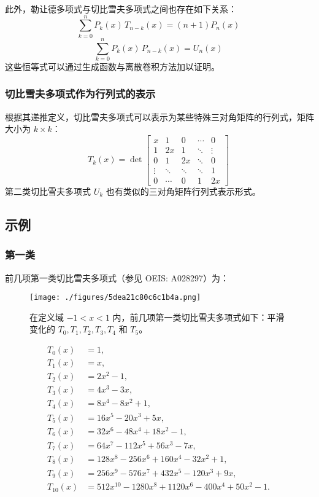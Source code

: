 此外，勒让德多项式与切比雪夫多项式之间也存在如下关系：
$$
\sum_{k=0}^{n} P_k(x)\, T_{n-k}(x) = (n + 1) P_n(x)~
$$
$$
\sum_{k=0}^{n} P_k(x)\, P_{n-k}(x) = U_n(x)~
$$
这些恒等式可以通过生成函数与离散卷积方法加以证明。
\subsubsection{切比雪夫多项式作为行列式的表示}
根据其递推定义，切比雪夫多项式可以表示为某些特殊三对角矩阵的行列式，矩阵大小为 $k \times k$：
$$
T_k(x) = \det
\begin{bmatrix}
x & 1 & 0 & \cdots & 0 \\
1 & 2x & 1 & \ddots & \vdots \\
0 & 1 & 2x & \ddots & 0 \\
\vdots & \ddots & \ddots & \ddots & 1 \\
0 & \cdots & 0 & 1 & 2x
\end{bmatrix}~
$$
第二类切比雪夫多项式 $U_k$ 也有类似的三对角矩阵行列式表示形式。
\subsection{示例}
\subsubsection{第一类}
前几项第一类切比雪夫多项式（参见 OEIS: A028297）为：
\begin{figure}[ht]
\centering
\texttt{[image: ./figures/5dea21c80c6c1b4a.png]}
\caption{在定义域 $-1 < x < 1$ 内，前几项第一类切比雪夫多项式如下：平滑变化的 $T_0, T_1, T_2, T_3, T_4$ 和 $T_5$。} \label{fig_QBXFdx_3}
\end{figure}
$$
\begin{aligned}
T_{0}(x)&=1,\\[1ex]
T_{1}(x)&=x,\\[1ex]
T_{2}(x)&=2x^{2}-1,\\[1ex]
T_{3}(x)&=4x^{3}-3x,\\[1ex]
T_{4}(x)&=8x^{4}-8x^{2}+1,\\[1ex]
T_{5}(x)&=16x^{5}-20x^{3}+5x,\\[1ex]
T_{6}(x)&=32x^{6}-48x^{4}+18x^{2}-1,\\[1ex]
T_{7}(x)&=64x^{7}-112x^{5}+56x^{3}-7x,\\[1ex]
T_{8}(x)&=128x^{8}-256x^{6}+160x^{4}-32x^{2}+1,\\[1ex]
T_{9}(x)&=256x^{9}-576x^{7}+432x^{5}-120x^{3}+9x,\\[1ex]
T_{10}(x)&=512x^{10}-1280x^{8}+1120x^{6}-400x^{4}+50x^{2}-1.
\end{aligned}~
$$
